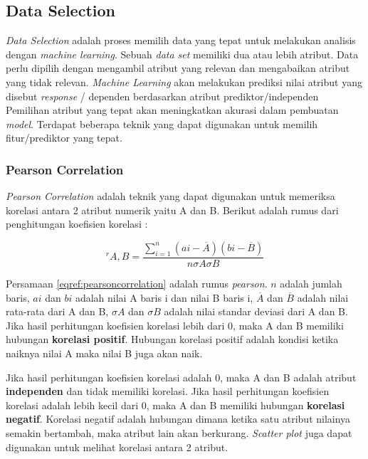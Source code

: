 \subsection{Data Selection}
\label{chap:dataselection}
\textit{Data Selection} adalah proses memilih data yang tepat untuk melakukan analisis dengan \textit{machine learning}. Sebuah \textit{data set} memiliki dua atau lebih atribut. Data perlu dipilih dengan mengambil atribut yang relevan dan mengabaikan atribut yang tidak relevan. \textit{Machine Learning} akan melakukan prediksi nilai atribut yang disebut \textit{response} / dependen berdasarkan atribut prediktor/independen Pemilihan atribut yang tepat akan meningkatkan akurasi dalam pembuatan \textit{model}. Terdapat beberapa teknik yang dapat digunakan untuk memilih fitur/prediktor yang tepat.

\subsubsection{Pearson Correlation}
\label{chap:teori_pearsoncorrelation}
\textit{Pearson Correlation} adalah teknik yang dapat digunakan untuk memeriksa korelasi antara 2 atribut numerik yaitu A dan B. Berikut adalah rumus dari penghitungan koefisien korelasi : 

\begin{equation}
^r A,B = \frac{\sum_{i=1}^{n}(ai - \overline{A})(bi - \overline{B})}{n\sigma A \sigma B}
\label{eqref:pearsoncorrelation}
\end{equation}

Persamaan \ref{eqref:pearsoncorrelation} adalah rumus \textit{pearson}. $n$ adalah jumlah baris, $ai$ dan $bi$ adalah nilai A baris i dan nilai B baris i, $ \overline{A} $  dan $\overline{B}$ adalah nilai rata-rata dari A dan B, $\sigma A$ dan $\sigma B$ adalah nilai standar deviasi dari A dan B. Jika hasil perhitungan koefisien korelasi lebih dari 0, maka A dan B memiliki hubungan \textbf{korelasi positif}. Hubungan korelasi positif adalah kondisi ketika naiknya nilai A maka nilai B juga akan naik. 

Jika hasil perhitungan koefisien korelasi adalah 0, maka A dan B adalah atribut \textbf{independen} dan tidak memiliki korelasi. Jika hasil perhitungan koefisien korelasi adalah lebih kecil dari 0, maka A dan B memiliki hubungan \textbf{korelasi negatif}. Korelasi negatif adalah hubungan dimana ketika satu atribut nilainya semakin bertambah, maka atribut lain akan berkurang. \textit{Scatter plot} juga dapat digunakan untuk melihat korelasi antara 2 atribut.  


